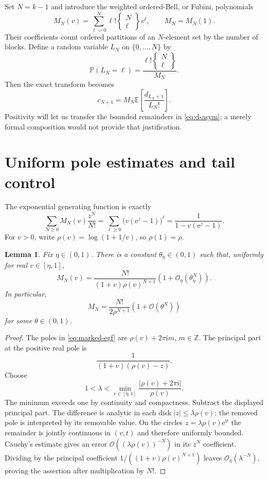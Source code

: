 \documentclass[11pt,letterpaper]{article}
\numberwithin{equation}{section}
\newtheorem{lemma}[theorem]{Lemma}
\theoremstyle{remark}\newtheorem{remark}[theorem]{Remark}
\newcommand{\E}{\mathbb E}
\newcommand{\Prob}{\mathbb P}
\newcommand{\ii}{\mathrm i}
\newcommand{\e}{\mathrm e}
\newcommand{\Ord}{\mathcal O}
\newcommand{\stir}[2]{\left\{\begin{smallmatrix}#1\\#2\end{smallmatrix}\right\}}
\begin{document}
Set $N=k-1$ and introduce the weighted ordered-Bell, or Fubini, polynomials
\begin{equation}\label{eq:fubini}
 M_N(v)=\sum_{\ell=0}^{N}\ell!\stir{N}{\ell}v^\ell,
 \qquad M_N=M_N(1).
\end{equation}
Their coefficients count ordered partitions of an $N$-element set by the number of blocks. Define a random variable $L_N$ on $\{0,\ldots,N\}$ by
\begin{equation}\label{eq:law}
 \Prob(L_N=\ell)=\frac{\ell!\stir{N}{\ell}}{M_N}.
\end{equation}
Then the exact transform becomes
\begin{equation}\label{eq:expect}
 c_{N+1}=M_N\E\left[\frac{d_{L_N+1}}{L_N!}\right].
\end{equation}
Positivity will let us transfer the bounded remainders in \eqref{eq:d-asym}; a merely formal composition would not provide that justification.

\section{Uniform pole estimates and tail control}
\label{sec:poles}
The exponential generating function is exactly
\begin{equation}\label{eq:marked-egf}
 \sum_{N\ge0}M_N(v)\frac{z^N}{N!}
 =\sum_{\ell\ge0}\bigl(v(\e^z-1)\bigr)^\ell
 =\frac1{1-v(\e^z-1)}.
\end{equation}
For $v>0$, write $\rho(v)=\log(1+1/v)$, so $\rho(1)=\rho$.

\begin{lemma}\label{lem:uniform}
Fix $\eta\in(0,1)$. There is a constant $\theta_\eta\in(0,1)$ such that, uniformly for real $v\in[\eta,1]$,
\begin{equation}\label{eq:uniform}
 M_N(v)=\frac{N!}{(1+v)\rho(v)^{N+1}}
                      \left(1+\Ord_\eta(\theta_\eta^N)\right).
\end{equation}
In particular,
\begin{equation}\label{eq:M-main}
 M_N=\frac{N!}{2\rho^{N+1}}\left(1+\Ord(\theta^N)\right)
\end{equation}
for some $\theta\in(0,1)$.
\end{lemma}
\begin{proof}
The poles in \eqref{eq:marked-egf} are $\rho(v)+2\pi\ii m$, $m\in\mathbb Z$. The principal part at the positive real pole is
\[
 \frac1{(1+v)(\rho(v)-z)}.
\]
Choose
\[
 1<\lambda<\min_{v\in[\eta,1]}
          \frac{|\rho(v)+2\pi\ii|}{\rho(v)}.
\]
The minimum exceeds one by continuity and compactness. Subtract the displayed principal part. The difference is analytic in each disk $|z|\le\lambda\rho(v)$; the removed pole is interpreted by its removable value. On the circles $z=\lambda\rho(v)\e^{\ii t}$ the remainder is jointly continuous in $(v,t)$ and therefore uniformly bounded. Cauchy's estimate gives an error $\Ord((\lambda\rho(v))^{-N})$ in its $z^N$ coefficient. Dividing by the principal coefficient $1/((1+v)\rho(v)^{N+1})$ leaves $\Ord_\eta(\lambda^{-N})$, proving the assertion after multiplication by $N!$.
\end{proof}
\end{document}
